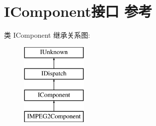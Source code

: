 \hypertarget{interface_i_component}{}\section{I\+Component接口 参考}
\label{interface_i_component}
类 I\+Component 继承关系图\+:\begin{figure}[H]
\begin{center}
\leavevmode
\includegraphics[height=4.000000cm]{interface_i_component}
\end{center}
\end{figure}
